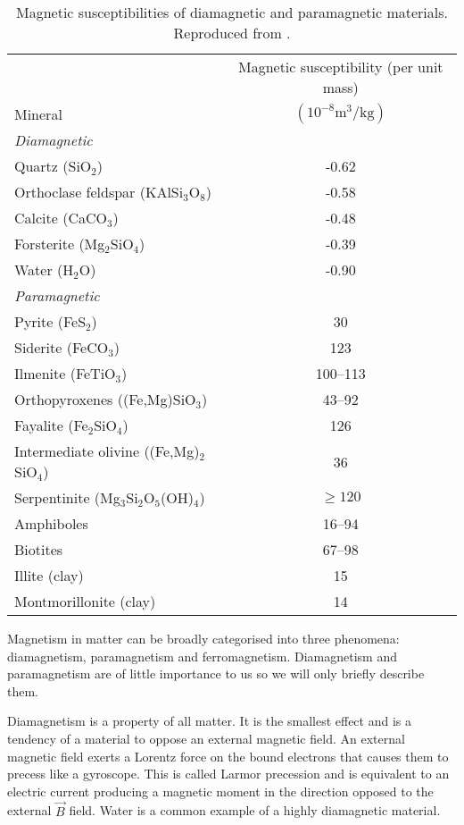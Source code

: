 \begin{table}\label{Susc}
\begin{tabular}{l c}
\hline
\hline
  & Magnetic susceptibility (per unit mass) \\ \cline{2-2}
Mineral & $(10^{-8} \mathrm{m}^{3}/\mathrm{kg})$ \\ \hline
\textit{Diamagnetic} & \\
Quartz (SiO$_2$) & -0.62 \\
Orthoclase feldspar (KAlSi$_3$O$_8$) & -0.58 \\
Calcite (CaCO$_3$) & -0.48 \\
Forsterite (Mg$_2$SiO$_4$) & -0.39 \\
Water (H$_2$O) & -0.90 \\
\textit{Paramagnetic} & \\
Pyrite (FeS$_2$) & 30 \\
Siderite (FeCO$_3$) & 123 \\
Ilmenite (FeTiO$_3$) & 100--113 \\
Orthopyroxenes ((Fe,Mg)SiO$_3$) & 43--92 \\
Fayalite (Fe$_2$SiO$_4$) & 126 \\
Intermediate olivine ((Fe,Mg)$_2$SiO$_4$) & 36 \\
Serpentinite (Mg$_3$Si$_2$O$_5$(OH)$_4$) & $\geq 120$ \\
Amphiboles & 16--94 \\
Biotites & 67--98 \\
Illite (clay) & 15 \\
Montmorillonite (clay) & 14 \\
\hline
\hline
\end{tabular}
\caption{Magnetic susceptibilities of diamagnetic and paramagnetic materials. Reproduced from \citet{DuOzRM}.}
\end{table}

Magnetism in matter can be broadly categorised into three phenomena: diamagnetism, paramagnetism and ferromagnetism. Diamagnetism and paramagnetism are of little importance to us so we will only briefly describe them.\par

Diamagnetism is a property of all matter. It is the smallest effect and is a tendency of a material to oppose an external magnetic field. An external magnetic field exerts a Lorentz force on the bound electrons that causes them to precess like a gyroscope. This is called Larmor precession and is equivalent to an electric current producing a magnetic moment in the direction opposed to the external $\vec{B}$ field. Water is a common example of a highly diamagnetic material.\par

